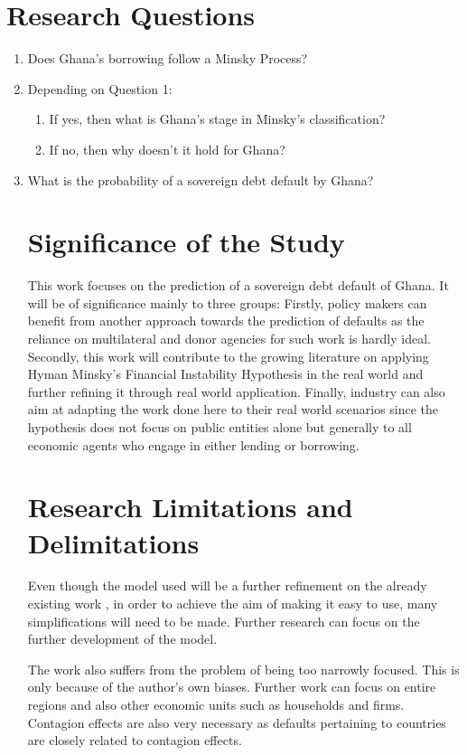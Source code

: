 \documentclass[a4paper, 12pt]{article}
\begin{document}
	\section{Research Questions}
	\begin{enumerate}
		\item Does Ghana's borrowing follow a Minsky Process?
		\item  Depending on Question 1:
		\begin{enumerate}
			\item If yes, then what is Ghana's stage in Minsky's classification?
			\item If no, then why doesn't it hold for Ghana?
		\end{enumerate}
		\item What is the probability of a sovereign debt default by Ghana?
		
	\section{Significance of the Study}
	This work focuses on the prediction of a sovereign debt default of Ghana. It will be of significance mainly to three groups: Firstly, policy makers can benefit from another approach towards the prediction of defaults as the reliance on multilateral and donor agencies for such work is hardly ideal. Secondly, this work will contribute to the growing literature on applying Hyman Minsky's Financial Instability Hypothesis in the real world and further refining it through real world application. Finally, industry can also aim at adapting the work done here to their real world scenarios since the hypothesis does not focus on public entities alone but generally to all economic agents who engage in either lending or borrowing.
	
	\section{Research Limitations and Delimitations}
	Even though the model used will be a further refinement on the already existing work \cite{vadasz2007economic,vercelli2009perspective,vercelli2010minsky}, in order to achieve the aim of making it easy to use, many simplifications will need to be made. Further research can focus on the further development of the model.
	
	The work also suffers from the problem of being too narrowly focused. This is only because of the author's own biases. Further work can focus on entire regions and also other economic units such as households and firms. Contagion effects are also very necessary as defaults pertaining to countries are closely related to contagion effects.
	

\end{enumerate}
\end{document}
